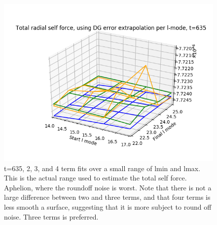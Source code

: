 \begin{figure}
  \includegraphics{bestfinflminlmax234termst635smallrange_perihelion}
  \caption{t=635, 2, 3, and 4 term fits over a small range of lmin and lmax. This is the actual range used to estimate the total self force. Aphelion, where the roundoff noise is worst. Note that there is not a large difference between two and three terms, and that four terms is less smooth a surface, suggesting that it is more subject to round off noise. Three terms is preferred.}
\end{figure}



